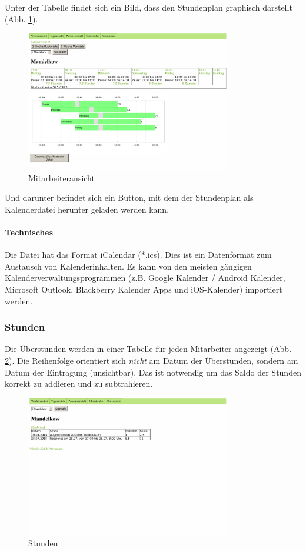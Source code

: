 \documentclass[10pt,a4paper,titlepage,oneside]{article}
\begin{document}
Unter der Tabelle findet sich ein Bild, dass den Stundenplan graphisch darstellt (Abb. \ref{fig:Mitarbeiteransicht}).
\begin{figure}[h]
\centering
\includegraphics[width=0.8\textwidth]{mitarbeiter-out}
\caption{Mitarbeiteransicht}
\label{fig:Mitarbeiteransicht}
\end{figure}
Und darunter befindet sich ein Button, mit dem der Stundenplan als Kalenderdatei herunter geladen werden kann.



\paragraph{Technisches}
Die Datei hat das Format iCalendar (*.ics). Dies ist ein Datenformat zum Austausch von Kalenderinhalten. Es kann von den meisten gängigen Kalenderverwaltungsprogrammen (z.B. Google Kalender / Android Kalender, Microsoft Outlook, Blackberry Kalender Apps und iOS-Kalender) importiert werden.




\subsubsection{Stunden}
Die Überstunden werden in einer Tabelle für jeden Mitarbeiter angezeigt (Abb. \ref{fig:Stunden}).
Die Reihenfolge orientiert sich \emph{nicht} am Datum der Überstunden, sondern am Datum der Eintragung (unsichtbar). Das ist notwendig um das Saldo der Stunden korrekt zu addieren und zu subtrahieren.

\begin{figure}[h]
\centering
\includegraphics[width=0.8\textwidth]{stunden-out}
\caption{Stunden}
\label{fig:Stunden}
\end{figure}
\end{document}
